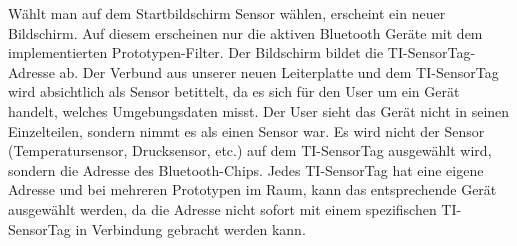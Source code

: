 Wählt man auf dem Startbildschirm \glqq Sensor wählen\grqq, erscheint ein neuer Bildschirm. Auf diesem erscheinen nur die aktiven Bluetooth Geräte mit dem implementierten Prototypen-Filter. Der Bildschirm bildet die TI-SensorTag-Adresse ab. Der Verbund aus unserer neuen Leiterplatte und dem TI-SensorTag wird absichtlich als Sensor betittelt, da es sich für den User um ein Gerät handelt, welches Umgebungsdaten misst. Der User sieht das Gerät nicht in seinen Einzelteilen, sondern nimmt es als einen Sensor war. Es wird nicht der Sensor (Temperatursensor, Drucksensor, etc.) auf dem TI-SensorTag ausgewählt wird, sondern die Adresse des Bluetooth-Chips. Jedes TI-SensorTag hat eine eigene Adresse und bei mehreren Prototypen im Raum, kann das entsprechende Gerät ausgewählt werden, da die Adresse nicht sofort mit einem spezifischen TI-SensorTag in Verbindung gebracht werden kann.

